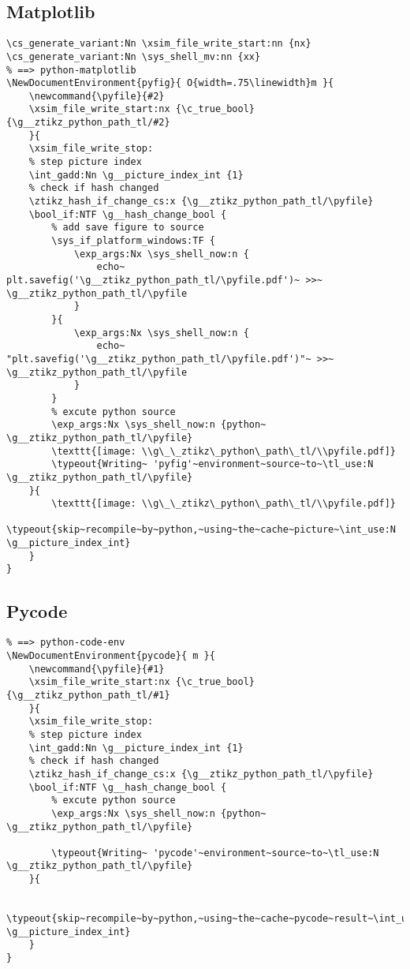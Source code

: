 \subsection{Matplotlib}
\begin{verbatim}
\cs_generate_variant:Nn \xsim_file_write_start:nn {nx}
\cs_generate_variant:Nn \sys_shell_mv:nn {xx}
% ==> python-matplotlib
\NewDocumentEnvironment{pyfig}{ O{width=.75\linewidth}m }{
    \newcommand{\pyfile}{#2}
    \xsim_file_write_start:nx {\c_true_bool}{\g__ztikz_python_path_tl/#2}
    }{ 
    \xsim_file_write_stop:
    % step picture index
    \int_gadd:Nn \g__picture_index_int {1}   
    % check if hash changed
    \ztikz_hash_if_change_cs:x {\g__ztikz_python_path_tl/\pyfile}   
    \bool_if:NTF \g__hash_change_bool {
        % add save figure to source
        \sys_if_platform_windows:TF {
            \exp_args:Nx \sys_shell_now:n {
                echo~ plt.savefig('\g__ztikz_python_path_tl/\pyfile.pdf')~ >>~ \g__ztikz_python_path_tl/\pyfile
            }
        }{
            \exp_args:Nx \sys_shell_now:n {
                echo~ "plt.savefig('\g__ztikz_python_path_tl/\pyfile.pdf')"~ >>~ \g__ztikz_python_path_tl/\pyfile
            }
        }
        % excute python source
        \exp_args:Nx \sys_shell_now:n {python~ \g__ztikz_python_path_tl/\pyfile} 
        \texttt{[image: \\g\_\_ztikz\_python\_path\_tl/\\pyfile.pdf]}
        \typeout{Writing~ 'pyfig'~environment~source~to~\tl_use:N \g__ztikz_python_path_tl/\pyfile}
    }{
        \texttt{[image: \\g\_\_ztikz\_python\_path\_tl/\\pyfile.pdf]}
        \typeout{skip~recompile~by~python,~using~the~cache~picture~\int_use:N \g__picture_index_int}
    }
}    
\end{verbatim}

\subsection{Pycode}
\begin{verbatim}
% ==> python-code-env
\NewDocumentEnvironment{pycode}{ m }{
    \newcommand{\pyfile}{#1}
    \xsim_file_write_start:nx {\c_true_bool}{\g__ztikz_python_path_tl/#1}
    }{ 
    \xsim_file_write_stop:
    % step picture index
    \int_gadd:Nn \g__picture_index_int {1}   
    % check if hash changed
    \ztikz_hash_if_change_cs:x {\g__ztikz_python_path_tl/\pyfile}   
    \bool_if:NTF \g__hash_change_bool {
        % excute python source
        \exp_args:Nx \sys_shell_now:n {python~ \g__ztikz_python_path_tl/\pyfile} 
        
        \typeout{Writing~ 'pycode'~environment~source~to~\tl_use:N \g__ztikz_python_path_tl/\pyfile}
    }{
        
        \typeout{skip~recompile~by~python,~using~the~cache~pycode~result~\int_use:N \g__picture_index_int}
    }
}
\end{verbatim}


